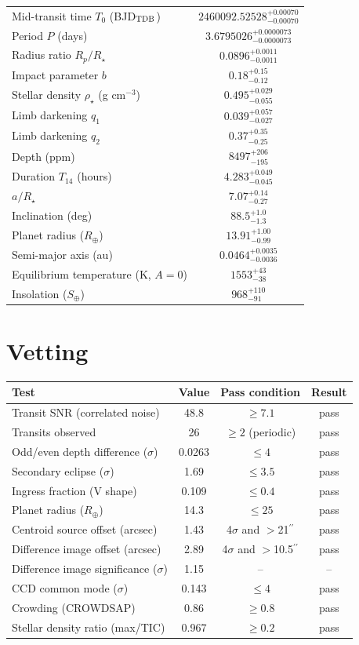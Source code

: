 \documentclass[11pt,a4paper]{article}
\newcommand{\arcsec}{$^{\prime\prime}$}
\begin{document}
\begin{tabular}{lc}\toprule
Mid-transit time $T_0$ (BJD$_{\rm TDB}$) & $2460092.52528^{+0.00070}_{-0.00070}$ \\
Period $P$ (days) & $3.6795026^{+0.0000073}_{-0.0000073}$ \\
Radius ratio $R_p/R_\star$ & $0.0896^{+0.0011}_{-0.0011}$ \\
Impact parameter $b$ & $0.18^{+0.15}_{-0.12}$ \\
Stellar density $\rho_\star$ (g cm$^{-3}$) & $0.495^{+0.029}_{-0.055}$ \\
Limb darkening $q_1$ & $0.039^{+0.057}_{-0.027}$ \\
Limb darkening $q_2$ & $0.37^{+0.35}_{-0.25}$ \\
Depth (ppm) & $8497^{+206}_{-195}$ \\
Duration $T_{14}$ (hours) & $4.283^{+0.049}_{-0.045}$ \\
$a/R_\star$ & $7.07^{+0.14}_{-0.27}$ \\
Inclination (deg) & $88.5^{+1.0}_{-1.3}$ \\
Planet radius ($R_\oplus$) & $13.91^{+1.00}_{-0.99}$ \\
Semi-major axis (au) & $0.0464^{+0.0035}_{-0.0036}$ \\
Equilibrium temperature (K, $A=0$) & $1553^{+43}_{-38}$ \\
Insolation ($S_\oplus$) & $968^{+110}_{-91}$ \\
\bottomrule\end{tabular}

\section*{Vetting}
\begin{tabular}{lccc}\toprule
Test & Value & Pass condition & Result \\\midrule
Transit SNR (correlated noise) & 48.8 & $\ge 7.1$ & pass \\
Transits observed & 26 & $\ge 2$ (periodic) & pass \\
Odd/even depth difference ($\sigma$) & 0.0263 & $\le 4$ & pass \\
Secondary eclipse ($\sigma$) & 1.69 & $\le 3.5$ & pass \\
Ingress fraction (V shape) & 0.109 & $\le 0.4$ & pass \\
Planet radius ($R_\oplus$) & 14.3 & $\le 25$ & pass \\
Centroid source offset (arcsec) & 1.43 & 4$\sigma$ and $>$21\arcsec & pass \\
Difference image offset (arcsec) & 2.89 & 4$\sigma$ and $>$10.5\arcsec & pass \\
Difference image significance ($\sigma$) & 1.15 & -- & -- \\
CCD common mode ($\sigma$) & 0.143 & $\le 4$ & pass \\
Crowding (CROWDSAP) & 0.86 & $\ge 0.8$ & pass \\
Stellar density ratio (max/TIC) & 0.967 & $\ge 0.2$ & pass \\
\bottomrule\end{tabular}
\end{document}

